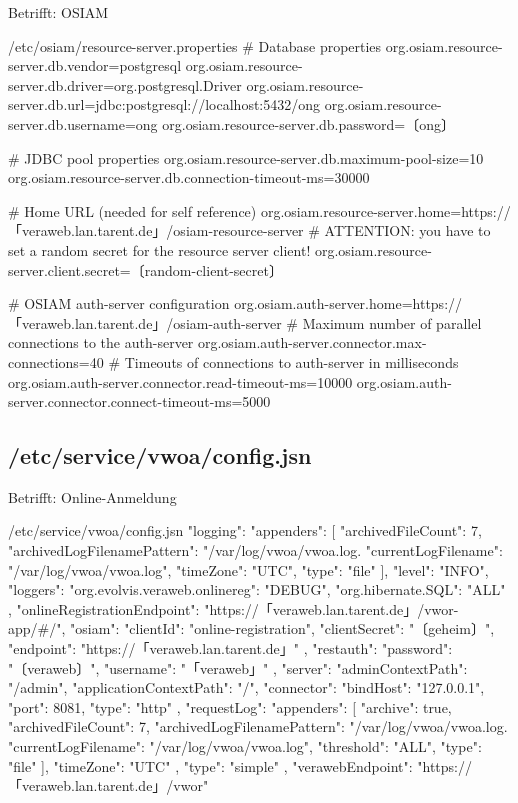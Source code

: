 \documentclass{tarentanleitung}
\begin{document}
Betrifft: OSIAM

\begin{lstdump}{/etc/osiam/resource-server.properties}
# Database properties
org.osiam.resource-server.db.vendor=postgresql
org.osiam.resource-server.db.driver=org.postgresql.Driver
org.osiam.resource-server.db.url=jdbc:postgresql://localhost:5432/ong
org.osiam.resource-server.db.username=ong
org.osiam.resource-server.db.password=〔ong〕

# JDBC pool properties
org.osiam.resource-server.db.maximum-pool-size=10
org.osiam.resource-server.db.connection-timeout-ms=30000

# Home URL (needed for self reference)
org.osiam.resource-server.home=https://「veraweb.lan.tarent.de」/osiam-resource-server
# ATTENTION: you have to set a random secret for the resource server client!
org.osiam.resource-server.client.secret=〔random-client-secret〕

# OSIAM auth-server configuration
org.osiam.auth-server.home=https://「veraweb.lan.tarent.de」/osiam-auth-server
# Maximum number of parallel connections to the auth-server
org.osiam.auth-server.connector.max-connections=40
# Timeouts of connections to auth-server in milliseconds
org.osiam.auth-server.connector.read-timeout-ms=10000
org.osiam.auth-server.connector.connect-timeout-ms=5000
\end{lstdump}

\subsection{/etc/service/vwoa/config.jsn}\label{subsec:refcfg-oa-cfg}

Betrifft: Online-Anmeldung

\begin{lstdump}{/etc/service/vwoa/config.jsn}
{
  "logging": {
    "appenders": [
      {
        "archivedFileCount": 7,
        "archivedLogFilenamePattern": "/var/log/vwoa/vwoa.log.%
        "currentLogFilename": "/var/log/vwoa/vwoa.log",
        "timeZone": "UTC",
        "type": "file"
      }
    ],
    "level": "INFO",
    "loggers": {
      "org.evolvis.veraweb.onlinereg": "DEBUG",
      "org.hibernate.SQL": "ALL"
    }
  },
  "onlineRegistrationEndpoint": "https://「veraweb.lan.tarent.de」/vwor-app/#/",
  "osiam": {
    "clientId": "online-registration",
    "clientSecret": "〔geheim〕",
    "endpoint": "https://「veraweb.lan.tarent.de」"
  },
  "restauth": {
    "password": "〔veraweb〕",
    "username": "「veraweb」"
  },
  "server": {
    "adminContextPath": "/admin",
    "applicationContextPath": "/",
    "connector": {
      "bindHost": "127.0.0.1",
      "port": 8081,
      "type": "http"
    },
    "requestLog": {
      "appenders": [
        {
          "archive": true,
          "archivedFileCount": 7,
          "archivedLogFilenamePattern": "/var/log/vwoa/vwoa.log.%
          "currentLogFilename": "/var/log/vwoa/vwoa.log",
          "threshold": "ALL",
          "type": "file"
        }
      ],
      "timeZone": "UTC"
    },
    "type": "simple"
  },
  "verawebEndpoint": "https://「veraweb.lan.tarent.de」/vwor"
}
\end{lstdump}
\end{document}
